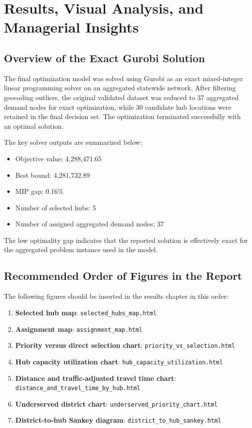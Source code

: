 \section{Results, Visual Analysis, and Managerial Insights}

\subsection{Overview of the Exact Gurobi Solution}

The final optimization model was solved using Gurobi as an exact mixed-integer linear programming solver on an aggregated statewide network. After filtering geocoding outliers, the original validated dataset was reduced to 37 aggregated demand nodes for exact optimization, while 30 candidate hub locations were retained in the final decision set. The optimization terminated successfully with an optimal solution.

The key solver outputs are summarized below:
\begin{itemize}
    \item Objective value: 4,288,471.65
    \item Best bound: 4,281,732.89
    \item MIP gap: 0.16\%
    \item Number of selected hubs: 5
    \item Number of assigned aggregated demand nodes: 37
\end{itemize}

The low optimality gap indicates that the reported solution is effectively exact for the aggregated problem instance used in the model.

\subsection{Recommended Order of Figures in the Report}

The following figures should be inserted in the results chapter in this order:
\begin{enumerate}
    \item \textbf{Selected hub map}: \texttt{selected\_hubs\_map.html}
    \item \textbf{Assignment map}: \texttt{assignment\_map.html}
    \item \textbf{Priority versus direct selection chart}: \texttt{priority\_vs\_selection.html}
    \item \textbf{Hub capacity utilization chart}: \texttt{hub\_capacity\_utilization.html}
    \item \textbf{Distance and traffic-adjusted travel time chart}: \texttt{distance\_and\_travel\_time\_by\_hub.html}
    \item \textbf{Underserved district chart}: \texttt{underserved\_priority\_chart.html}
    \item \textbf{District-to-hub Sankey diagram}: \texttt{district\_to\_hub\_sankey.html}
\end{enumerate}

